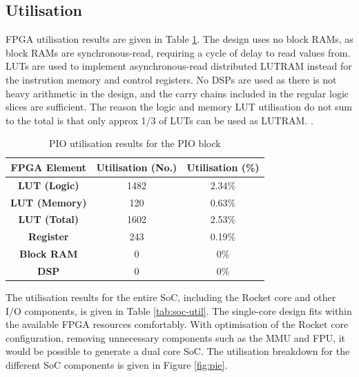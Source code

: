 \subsection{Utilisation}
\label{sec:synth-res}

FPGA utilisation results are given in Table \ref{tab:pio-util}. The design uses no block RAMs, as block RAMs are synchronous-read, requiring a cycle of delay to read values from. LUTs are used to implement asynchronous-read distributed LUTRAM instead for the instrution memory and control registers. No DSPs are used as there is not heavy arithmetic in the design, and the carry chains included in the regular logic slices are sufficient. The reason the logic and memory LUT utilisation do not sum to the total is that only approx 1/3 of LUTs can be used as LUTRAM. \cite{clb_ug}.

\begin{table}[h!]
    \centering
    \begin{tabular}{|c|c|c|}
        \hline
        \textbf{FPGA Element} & \textbf{Utilisation (No.)} & \textbf{Utilisation  (\%)} \\
        \hline
        \textbf{LUT (Logic)}  & 1482                       & 2.34\%                     \\
        \hline
        \textbf{LUT (Memory)} & 120                        & 0.63\%                     \\
        \hline
        \textbf{LUT (Total)}  & 1602                       & 2.53\%                     \\
        \hline
        \textbf{Register}     & 243                        & 0.19\%                     \\
        \hline
        \textbf{Block RAM}    & 0                          & 0\%                        \\
        \hline
        \textbf{DSP}          & 0                          & 0\%                        \\
        \hline
    \end{tabular}
    \caption{PIO utilisation results for the PIO block}
    \label{tab:pio-util}
\end{table}

The utilisation results for the entire SoC, including the Rocket core and other I/O components, is given in Table \ref{tab:soc-util}. The single-core design fits within the available FPGA resources comfortably. With optimisation of the Rocket core configuration, removing unnecessary components such as the MMU and FPU, it would be possible to generate a dual core SoC. The utilisation breakdown for the different SoC components is given in Figure \ref{fig:pie}.

